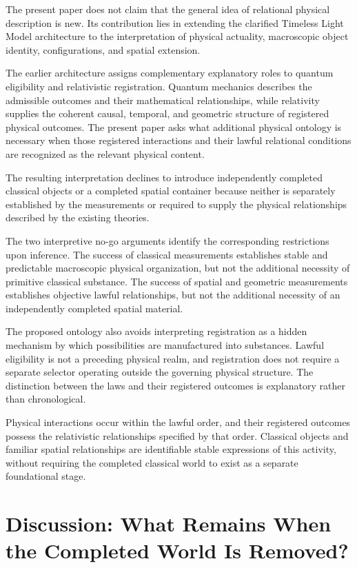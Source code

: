 \documentclass[12pt,onecolumn]{article}
\begin{document}
The present paper does not claim that the general idea of relational physical description is new. Its contribution lies in extending the clarified Timeless Light Model architecture to the interpretation of physical actuality, macroscopic object identity, configurations, and spatial extension.

The earlier architecture assigns complementary explanatory roles to quantum eligibility and relativistic registration. Quantum mechanics describes the admissible outcomes and their mathematical relationships, while relativity supplies the coherent causal, temporal, and geometric structure of registered physical outcomes. The present paper asks what additional physical ontology is necessary when those registered interactions and their lawful relational conditions are recognized as the relevant physical content.

The resulting interpretation declines to introduce independently completed classical objects or a completed spatial container because neither is separately established by the measurements or required to supply the physical relationships described by the existing theories.

The two interpretive no-go arguments identify the corresponding restrictions upon inference. The success of classical measurements establishes stable and predictable macroscopic physical organization, but not the additional necessity of primitive classical substance. The success of spatial and geometric measurements establishes objective lawful relationships, but not the additional necessity of an independently completed spatial material.

The proposed ontology also avoids interpreting registration as a hidden mechanism by which possibilities are manufactured into substances. Lawful eligibility is not a preceding physical realm, and registration does not require a separate selector operating outside the governing physical structure. The distinction between the laws and their registered outcomes is explanatory rather than chronological.

Physical interactions occur within the lawful order, and their registered outcomes possess the relativistic relationships specified by that order. Classical objects and familiar spatial relationships are identifiable stable expressions of this activity, without requiring the completed classical world to exist as a separate foundational stage.

\section{Discussion: What Remains When the Completed World Is Removed?}
\end{document}
